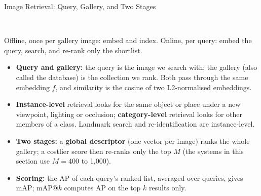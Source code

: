 \begin{frame}{Image Retrieval: Query, Gallery, and Two Stages}
  \begin{center}
    \\[0.25em]
    {\scriptsize Offline, once per gallery image: embed and index. Online, per query: embed the query, search, and re-rank only the shortlist.\par}
  \end{center}
  \vspace{-0.2em}
  \begin{itemize}\footnotesize\itemsep0.3em
    \item \textbf{Query and gallery:} the query is the image we search with; the gallery (also called the database) is the collection we rank. Both pass through the same embedding $f$, and similarity is the cosine of two L2-normalised embeddings.
    \item \textbf{Instance-level} retrieval looks for the same object or place under a new viewpoint, lighting or occlusion; \textbf{category-level} retrieval looks for other members of a class. Landmark search and re-identification are instance-level.
    \item \textbf{Two stages:} a \textbf{global descriptor} (one vector per image) ranks the whole gallery; a costlier score then re-ranks only the top $M$ (the systems in this section use $M = 400$ to 1{,}000).
    \item \textbf{Scoring:} the AP of each query's ranked list, averaged over queries, gives mAP; mAP@$k$ computes AP on the top $k$ results only.
  \end{itemize}
\end{frame}


